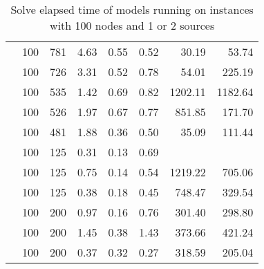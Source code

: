\begin{table}[]
\begin{tabular}{rrrrrrrr}
                    & 100   & 781   & 4.63    & 0.55    & 0.52    & 30.19   & 53.74   \\
                    & 100   & 726   & 3.31    & 0.52    & 0.78    & 54.01   & 225.19  \\
                    & 100   & 535   & 1.42    & 0.69    & 0.82    & 1202.11 & 1182.64 \\
                    & 100   & 526   & 1.97    & 0.67    & 0.77    & 851.85  & 171.70  \\
                    & 100   & 481   & 1.88    & 0.36    & 0.50    & 35.09   & 111.44  \\
                    & 100   & 125   & 0.31    & 0.13    & 0.69    &         &         \\
                    & 100   & 125   & 0.75    & 0.14    & 0.54    & 1219.22 & 705.06  \\
                    & 100   & 125   & 0.38    & 0.18    & 0.45    & 748.47  & 329.54  \\
                    & 100   & 200   & 0.97    & 0.16    & 0.76    & 301.40  & 298.80  \\
                    & 100   & 200   & 1.45    & 0.38    & 1.43    & 373.66  & 421.24  \\
                    & 100   & 200   & 0.37    & 0.32    & 0.27    & 318.59  & 205.04 
\end{tabular}
\caption{Solve elapsed time of models running on instances with 100 nodes and 1 or 2 sources}
\label{tab:time:100}
\end{table}
